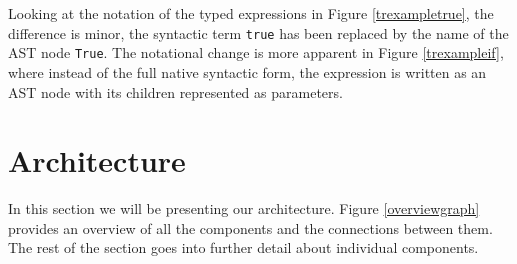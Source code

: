 \documentclass[nofilelist]{cslthse-msc}
\newcommand{\CR}[1]{\textcolor{green!60!black}{[\textbf{CR}:#1]}}
\begin{document}
Looking at the notation of the typed expressions in Figure \ref{trexampletrue}, the difference is minor, the syntactic term \lstinline{true} has been replaced by the name of the AST node \lstinline{True}.
The notational change is more apparent in Figure \ref{trexampleif}, where instead of the full native syntactic form, the expression is written as an AST node with its children represented as parameters.



\section{Architecture}\label{sectionarchitecture}
In this section we will be presenting our architecture.
Figure \ref{overviewgraph} provides an overview of all the components and the connections between them.
The rest of the section goes into further detail about individual components.
\end{document}
